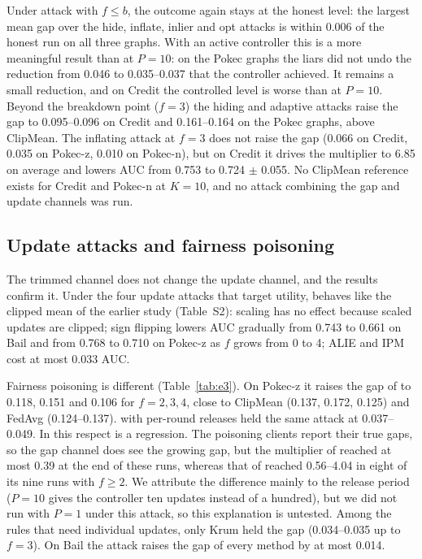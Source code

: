 Under attack with $f\le b$, the outcome again stays at the honest level: the largest mean gap over the hide, inflate, inlier and opt attacks is within 0.006 of the honest run on all three graphs. With an active controller this is a more meaningful result than at $P=10$: on the Pokec graphs the liars did not undo the reduction from 0.046 to 0.035--0.037 that the controller achieved. It remains a small reduction, and on Credit the controlled level is worse than at $P=10$. Beyond the breakdown point ($f=3$) the hiding and adaptive attacks raise the gap to 0.095--0.096 on Credit and 0.161--0.164 on the Pokec graphs, above ClipMean. The inflating attack at $f=3$ does not raise the gap (0.066 on Credit, 0.035 on Pokec-z, 0.010 on Pokec-n), but on Credit it drives the multiplier to 6.85 on average and lowers AUC from 0.753 to 0.724 $\pm$ 0.055. No ClipMean reference exists for Credit and Pokec-n at $K=10$, and no attack combining the gap and update channels was run.

\subsection{Update attacks and fairness poisoning}\label{sec:byz}



The trimmed channel does not change the update channel, and the results confirm it. Under the four update attacks that target utility, \rt{} behaves like the clipped mean of the earlier study (Table~S2): scaling has no effect because scaled updates are clipped; sign flipping lowers AUC gradually from 0.743 to 0.661 on Bail and from 0.768 to 0.710 on Pokec-z as $f$ grows from 0 to 4; ALIE and IPM cost at most 0.033 AUC.

Fairness poisoning is different (Table~\ref{tab:e3}). On Pokec-z it raises the gap of \rt{} to 0.118, 0.151 and 0.106 for $f=2,3,4$, close to ClipMean (0.137, 0.172, 0.125) and FedAvg (0.124--0.137). \clamp{} with per-round releases held the same attack at 0.037--0.049. In this respect \rt{} is a regression. The poisoning clients report their true gaps, so the gap channel does see the growing gap, but the multiplier of \rt{} reached at most 0.39 at the end of these runs, whereas that of \clamp{} reached 0.56--4.04 in eight of its nine runs with $f\ge2$. We attribute the difference mainly to the release period ($P=10$ gives the controller ten updates instead of a hundred), but we did not run \rt{} with $P=1$ under this attack, so this explanation is untested. Among the rules that need individual updates, only Krum held the gap (0.034--0.035 up to $f=3$). On Bail the attack raises the gap of every method by at most 0.014.

